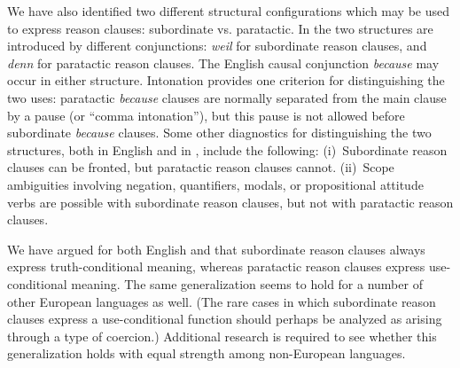 We have also identified two different structural configurations which may be used to express reason clauses: subordinate vs. paratactic. In  the two structures are introduced by different conjunctions: \textit{weil} for subordinate reason clauses, and \textit{denn} for paratactic reason clauses. The English causal conjunction \textit{because} may occur in either structure. Intonation provides one criterion for distinguishing the two uses: paratactic \textit{because} clauses are normally separated from the main clause by a pause (or “comma intonation”), but this pause is not allowed before subordinate \textit{because} clauses. Some other diagnostics for distinguishing the two structures, both in English and in , include the following: (i)~Subordinate reason clauses can be fronted, but paratactic reason clauses cannot. (ii)~Scope ambiguities involving negation, quantifiers, modals, or propositional attitude verbs are possible with subordinate reason clauses, but not with paratactic reason clauses.


We have argued for both English and  that subordinate reason clauses always express truth-conditional meaning, whereas paratactic reason clauses express use-conditional meaning. The same generalization seems to hold for a number of other European languages as well. (The rare cases in which subordinate reason clauses express a use-conditional function should perhaps be analyzed as arising through a type of coercion.) Additional research is required to see whether this generalization holds with equal strength among non-European languages. 




